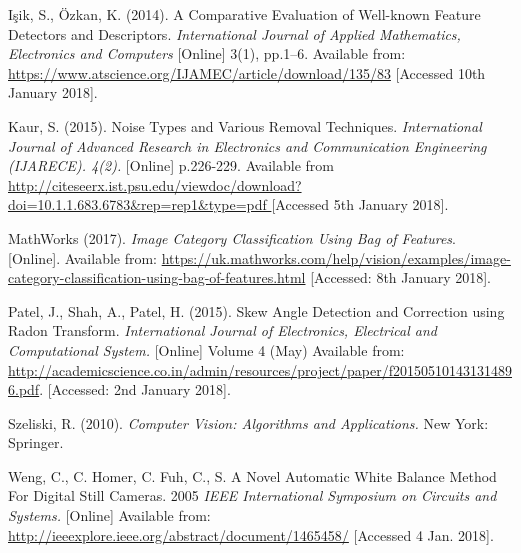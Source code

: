 \documentclass[a4paper, 12pt]{article}
\begin{document}
Işik, S., Özkan, K. (2014). A Comparative Evaluation of Well-known Feature Detectors and Descriptors. \textit{International Journal of Applied Mathematics, Electronics and Computers} [Online] 3(1), pp.1–6. Available from: \url{https://www.atscience.org/IJAMEC/article/download/135/83} [Accessed 10th January 2018].  

Kaur, S. (2015). Noise Types and Various Removal Techniques. \textit{International Journal of Advanced Research in Electronics and Communication Engineering (IJARECE). 4(2).} [Online] p.226-229. Available from \url{http://citeseerx.ist.psu.edu/viewdoc/download?doi=10.1.1.683.6783&rep=rep1&type=pdf
} [Accessed 5th January 2018].

MathWorks (2017). \textit{Image Category Classification Using Bag of Features}. [Online]. Available from: \url{https://uk.mathworks.com/help/vision/examples/image-category-classification-using-bag-of-features.html} [Accessed: 8th January 2018].

Patel, J., Shah, A., Patel, H. (2015). Skew Angle Detection and Correction using Radon Transform. \textit{International Journal of Electronics, Electrical and Computational System.} [Online] Volume 4 (May) Available from: \url{http://academicscience.co.in/admin/resources/project/paper/f201505101431314896.pdf}. [Accessed: 2nd January 2018].

Szeliski, R. (2010). \textit{Computer Vision: Algorithms and Applications.} New York: Springer.

Weng, C., C. Homer, C. Fuh, C., S. A Novel Automatic White Balance Method For Digital Still Cameras. 2005 \textit{IEEE International Symposium on Circuits and Systems.} [Online] Available from: \url{http://ieeexplore.ieee.org/abstract/document/1465458/} [Accessed 4 Jan. 2018].
\end{document}
